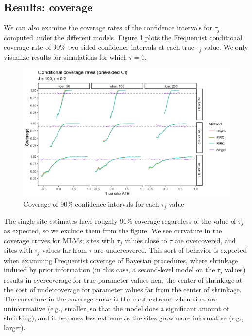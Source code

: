 \documentclass[]{article}
\begin{document}
\subsection{Results: coverage}

We can also examine the coverage rates of the confidence intervals for $\tau_j$ computed under the different models.
Figure \ref{fig:coverage_plot} plots the Frequentist conditional coverage rate of 90\% two-sided confidence intervals at each true $\tau_j$ value.
We only visualize results for simulations for which $\tau = 0$.

\begin{figure}[ht]
	\centering
	\includegraphics[width=\textwidth]{coverage_plot}
	\caption{Coverage of 90\% confidence intervals for each $\tau_j$ value}
	\label{fig:coverage_plot}
\end{figure}

The single-site estimates have roughly 90\% coverage regardless of the value of $\tau_j$ as expected, so we exclude them from the figure.
We see curvature in the coverage curves for MLMs; sites with $\tau_j$ values close to $\tau$ are overcovered, and sites with $\tau_j$ values far from $\tau$ are undercovered.
This sort of behavior is expected when examining Frequentist coverage of Bayesian procedures, where shrinkage induced by prior information (in this case, a second-level model on the $\tau_j$ values) results in overcoverage for true parameter values near the center of shrinkage at the cost of undercoverage for parameter values far from the center of shrinkage.
The curvature in the coverage curve is the most extreme when sites are uninformative (e.g., smaller, so that the model does a significant amount of shrinking), and it becomes less extreme as the sites grow more informative (e.g., larger).
\end{document}

